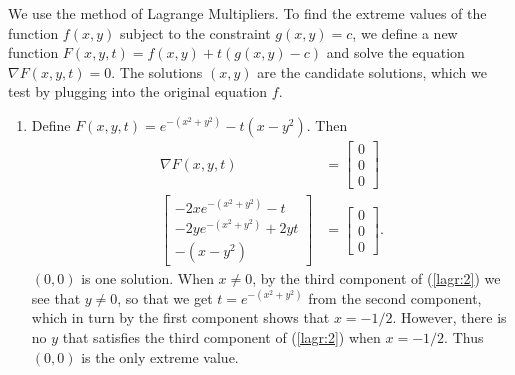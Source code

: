 \item

We use the method of Lagrange Multipliers.  To find the extreme values
of the function $f(x,y)$ subject to the constraint $g(x,y)=c$, we define
a new function $F(x,y,t) = f(x,y) + t(g(x,y) - c)$ and solve the equation
$\nabla F(x,y,t) = 0$.  The solutions $(x,y)$ are the candidate solutions,
which we test by plugging into the original equation $f$.

\begin{enumerate}
 \item
  Define $F(x,y,t) = e^{-(x^2+y^2)} - t(x - y^2)$.  Then
  \begin{align}
   \nabla F(x,y,t) &= \begin{bmatrix} 0 \\ 0 \\ 0 \end{bmatrix} \nonumber \\
   \begin{bmatrix}
    -2xe^{-(x^2+y^2)} - t \\
    -2ye^{-(x^2+y^2)} + 2yt \\
    -(x - y^2)
   \end{bmatrix} &= \begin{bmatrix} 0 \\ 0 \\ 0 \end{bmatrix}. \label{lagr:2}
  \end{align}
  $(0,0)$ is one solution.  When $x \neq 0$, by the third component of
  (\ref{lagr:2}) we see that $y \neq 0$, so that we get $t = e^{-(x^2+y^2)}$
  from the second component, which in turn by the first component shows
  that $x = -1/2$.  However, there is no $y$ that satisfies the third
  component of (\ref{lagr:2}) when $x = -1/2$.  Thus $(0, 0)$ is the only
  extreme value.


\end{enumerate}
